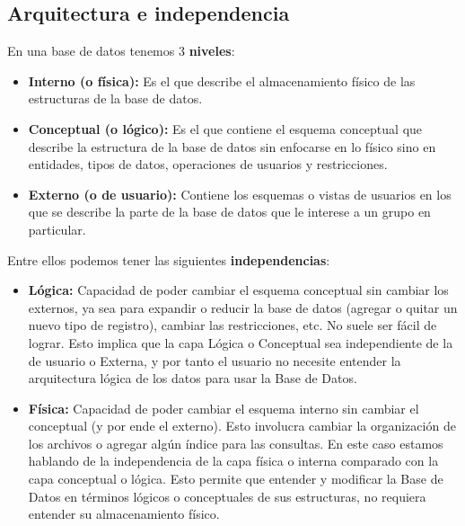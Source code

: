 \subsection*{Arquitectura e independencia}
En una base de datos tenemos 3 \textbf{niveles}:
\begin{itemize}
    \item \textbf{Interno (o física):} Es el que describe el almacenamiento físico de las estructuras de la base de datos.
    \item \textbf{Conceptual (o lógico):} Es el que contiene el esquema conceptual que describe la estructura de la base de datos sin enfocarse en lo físico sino en entidades, tipos de datos, operaciones de usuarios y restricciones.
    \item \textbf{Externo (o de usuario):} Contiene los esquemas o vistas de usuarios en los que se describe la parte de la base de datos que le interese a un grupo en particular.
\end{itemize}
Entre ellos podemos tener las siguientes \textbf{independencias}:
\begin{itemize}
    \item \textbf{Lógica:} Capacidad de poder cambiar el esquema conceptual sin cambiar los externos, ya sea para expandir o reducir la base de datos  (agregar o quitar un nuevo tipo de registro), cambiar las restricciones, etc. No suele ser fácil de lograr.
    Esto implica que la capa Lógica o Conceptual sea independiente de la de usuario o Externa, y por tanto el usuario no necesite entender la arquitectura lógica de los datos para usar la Base de Datos.
    \item \textbf{Física:} Capacidad de poder cambiar el esquema interno sin cambiar el conceptual (y por ende el externo). Esto involucra cambiar la organización de los archivos o agregar algún índice para las consultas. En este caso estamos hablando de la independencia de la capa física o interna comparado con la capa conceptual o lógica. Esto permite que entender y modificar la Base de Datos en términos lógicos o conceptuales de sus estructuras, no requiera entender su almacenamiento físico.
\end{itemize}
